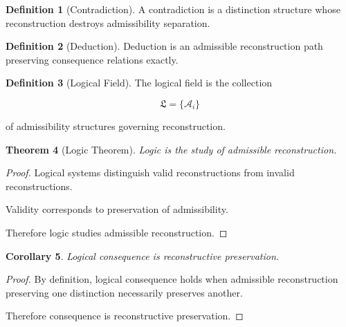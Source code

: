 \documentclass[12pt,oneside]{article}
\newtheorem{theorem}{Theorem}[section] \newtheorem{lemma}[theorem]{Lemma} \newtheorem{proposition}[theorem]{Proposition} \newtheorem{corollary}[theorem]{Corollary}
\theoremstyle{definition}
\newtheorem{definition}[theorem]{Definition} \newtheorem{axiom}[theorem]{Axiom} \newtheorem{remark}[theorem]{Remark} \newtheorem{example}[theorem]{Example}
\begin{document}
\begin{definition}[Contradiction]

A contradiction is a distinction structure whose reconstruction destroys admissibility separation.

\end{definition}

\begin{definition}[Deduction]

Deduction is an admissible reconstruction path preserving consequence relations exactly.

\end{definition}

\begin{definition}[Logical Field]

The logical field is the collection

\[
\mathfrak L
=
\{\mathcal A_i\}
\]

of admissibility structures governing reconstruction.

\end{definition}

\begin{theorem}[Logic Theorem]

Logic is the study of admissible reconstruction.

\end{theorem}

\begin{proof}

Logical systems distinguish valid reconstructions from invalid reconstructions.

Validity corresponds to preservation of admissibility.

Therefore logic studies admissible reconstruction.

\end{proof}

\begin{corollary}

Logical consequence is reconstructive preservation.

\end{corollary}

\begin{proof}

By definition, logical consequence holds when admissible reconstruction preserving one distinction necessarily preserves another.

Therefore consequence is reconstructive preservation.

\end{proof}
\end{document}
